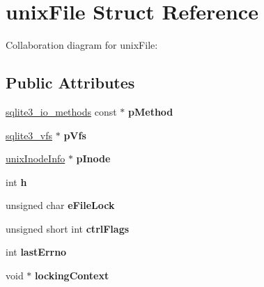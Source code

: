 \hypertarget{structunixFile}{}\section{unix\+File Struct Reference}
\label{structunixFile}


Collaboration diagram for unix\+File\+:
\subsection*{Public Attributes}
\begin{DoxyCompactItemize}
\item 
\hyperlink{structsqlite3__io__methods}{sqlite3\+\_\+io\+\_\+methods} const $\ast$ {\bfseries p\+Method}\hypertarget{structunixFile_a2a2b40e965f91aa9ee21135bfb0c17ec}{}\label{structunixFile_a2a2b40e965f91aa9ee21135bfb0c17ec}

\item 
\hyperlink{structsqlite3__vfs}{sqlite3\+\_\+vfs} $\ast$ {\bfseries p\+Vfs}\hypertarget{structunixFile_a048d696479bb2544ab2cec1ac9a75d67}{}\label{structunixFile_a048d696479bb2544ab2cec1ac9a75d67}

\item 
\hyperlink{structunixInodeInfo}{unix\+Inode\+Info} $\ast$ {\bfseries p\+Inode}\hypertarget{structunixFile_ac17292fe29bb6cc9eceed9db6d1209e8}{}\label{structunixFile_ac17292fe29bb6cc9eceed9db6d1209e8}

\item 
int {\bfseries h}\hypertarget{structunixFile_a1c58798d4ff3ac6232765c8b76bb7450}{}\label{structunixFile_a1c58798d4ff3ac6232765c8b76bb7450}

\item 
unsigned char {\bfseries e\+File\+Lock}\hypertarget{structunixFile_a001e59bdb9d3f396952c2c8e3229f7fc}{}\label{structunixFile_a001e59bdb9d3f396952c2c8e3229f7fc}

\item 
unsigned short int {\bfseries ctrl\+Flags}\hypertarget{structunixFile_a05d9d0af8aa4d9de6a250984cc12ae56}{}\label{structunixFile_a05d9d0af8aa4d9de6a250984cc12ae56}

\item 
int {\bfseries last\+Errno}\hypertarget{structunixFile_afde57c2e118fac8041918dac2ee6f7d1}{}\label{structunixFile_afde57c2e118fac8041918dac2ee6f7d1}

\item 
void $\ast$ {\bfseries locking\+Context}\hypertarget{structunixFile_afaeb4425a6de3e913db4b03e8a0d098a}{}\label{structunixFile_afaeb4425a6de3e913db4b03e8a0d098a}


\end{DoxyCompactItemize}
